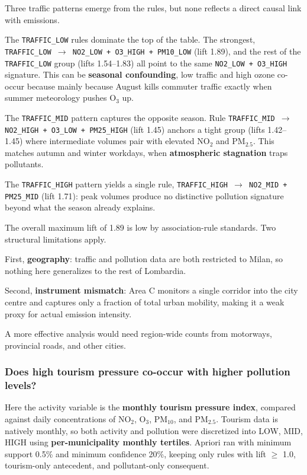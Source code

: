 \documentclass{article}
\begin{document}
	Three traffic patterns emerge from the rules, but none reflects a direct causal link with emissions.

	The \texttt{TRAFFIC\_LOW} rules dominate the top of the table. The strongest, \texttt{TRAFFIC\_LOW $\rightarrow$ NO2\_LOW + O3\_HIGH + PM10\_LOW} (lift 1.89), and the rest of the \texttt{TRAFFIC\_LOW} group (lifts 1.54--1.83) all point to the same \texttt{NO2\_LOW + O3\_HIGH} signature. 
	This can be \textbf{seasonal confounding}, low traffic and high ozone co-occur because mainly because August kills commuter traffic exactly when summer meteorology pushes O$_3$ up.
	
	The \texttt{TRAFFIC\_MID} pattern captures the opposite season. 
	Rule \texttt{TRAFFIC\_MID $\rightarrow$ NO2\_HIGH + O3\_LOW + PM25\_HIGH} (lift 1.45) anchors a tight group (lifts 1.42--1.45) where intermediate volumes pair with elevated NO$_2$ and PM$_{2.5}$. 
	This matches autumn and winter workdays, when \textbf{atmospheric stagnation} traps pollutants.

	The \texttt{TRAFFIC\_HIGH} pattern yields a single rule, \texttt{TRAFFIC\_HIGH $\rightarrow$ NO2\_MID + PM25\_MID} (lift 1.71): peak volumes produce no distinctive pollution signature beyond what the season already explains.

	The overall maximum lift of 1.89 is low by association-rule standards. Two structural limitations apply. 

	First, \textbf{geography}: traffic and pollution data are both restricted to Milan, so nothing here generalizes to the rest of Lombardia. 

	Second, \textbf{instrument mismatch}: Area C monitors a single corridor into the city centre and captures only a fraction of total urban mobility, making it a weak proxy for actual emission intensity. 

	A more effective analysis would need region-wide counts from motorways, provincial roads, and other cities.

	\newpage
	\subsubsection{Does high tourism pressure co-occur with higher pollution levels?}

	Here the activity variable is the \textbf{monthly tourism pressure index}, compared against daily concentrations of NO$_2$, O$_3$, PM$_{10}$, and PM$_{2.5}$.
	Tourism data is natively monthly, so both activity and pollution were discretized into LOW, MID, HIGH using \textbf{per-municipality monthly tertiles}. 
	Apriori ran with minimum support 0.5\% and minimum confidence 20\%, keeping only rules with lift $\geq$ 1.0, tourism-only antecedent, and pollutant-only consequent.
\end{document}
